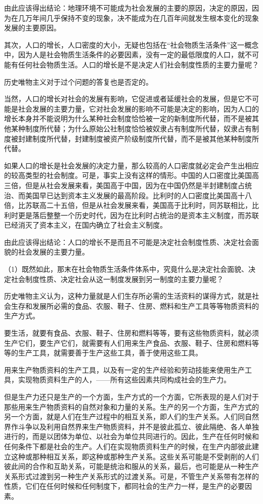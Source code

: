 由此应该得出结论：地理环境不可能成为社会发展的主要的原因，决定的原因，因为在几万年间几乎保持不变的现象，决不能成为在几百年间就发生根本变化的现象发展的主要原因。

其次，人口的增长，人口密度的大小，无疑也包括在“社会物质生活条件”这一概念中，因为人是社会物质生活条件的必要因素，没有一定的最低限度的人口，就不可能有任何社会物质生活。人口的增长是不是决定人们社会制度性质的主要力量呢？

历史唯物主义对于过个问题的答复也是否定的。

当然，人口的增长对社会的发展有影响，它促进或者延缓社会的发展，但是它不可能是社会发展的主要力量，它对社会发展的影响不可能是决定的影响，因为人口的增长本身并不能说明为什么某种社会制度恰恰被一定的新制度所代替，而不是被其他某种制度所代替；为什么原始公社制度恰恰被奴隶占有制度所代替，奴隶占有制度被封建制度所代替，封建制度被资产阶级制度所代替，而不是被其他某种制度所代替。

如果人口的增长是社会发展的决定力量，那么较高的人口密度就必定会产生出相应的较高类型的社会制度。可是，事实上没有这样的情形。中国的人口密度比美国高三倍，但是从社会发展来看，美国高于中国，因为在中国仍然是半封建制度占统治、而美国早已达到资本主义发展的最高阶段。比利时的人口密度比美国高十八倍，比苏联高二十五倍，但是从社会发展来看，美国高于比利时，同苏联相比，比利时更是落后整整一个历史时代，因为在比利时占统治的是资本主义制度，而苏联已经消灭了资本主义，在国内确立了社会主义制度。

由此应该得出结论：人口的增长不是而且不可能是决定社会制度性质、决定社会面貌的社会发展的主要力量。

（1）既然如此，那末在社会物质生活条件体系中，究竟什么是决定社会面貌、决定社会制度性质、决定社会从这一制度发展到另一制度的主要力量呢？

历史唯物主义认为，这种力量就是人们生存所必需的生活资料的谋得方式，就是社会生存和发展所必需的食品、农服、鞋子、住房、燃料和生产工具等等物质资料的生产方式。

要生活，就要有食品、衣服、鞋子、住房和燃料等等，要有这些物质资料，就必须生产它们，要生产它们，就需要有人们用来生产食品、衣服、鞋子、住房和燃料等等的生产工具，就需要善于生产这些工具，善于使用这些工具。

用来生产物质资料的生产工具，以及有一定的生产经验和劳动技能来使用生产工具，实现物质资料生产的人，——所有这些因素共同构成社会的生产力。

但是生产力还只是生产的一个方面，生产方式的一个方面，它所表现的是人们对于那些用来生产物质资料的自然对象和力量的关系。生产的另一个方面，生产方式的另一个方面，就是人们在生产过程中的相互关系，即人们的生产关系。人们同自然界作斗争以及利用自然界来生产物质资料，并不是彼此孤立、彼此隔绝、各人单独进行的，而是以团体为单位、以社会为单位共同进行的。因此，生产在任何时候和任何条件下都是社会的生产。人们在实现物质资料生产的时候，在生产内部彼此建立这种或那种相互关系，即这种或那种生产关系。这些关系可能是不受剥削的人们彼此间的合作和互助关系，可能是统治和服从的关系，最后，也可能是从一种生产关系形式过渡到另一种生产关系形式的过渡关系。可是，不管生产关系带有怎样的性质，它们在任何时候和任何制度下，都同社会的生产力一样，是生产的必要因素。

